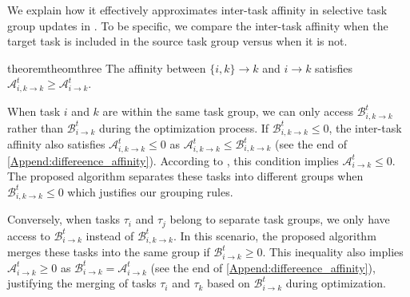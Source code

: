 We explain how it effectively approximates inter-task affinity in selective task group updates in . To be specific, we compare the inter-task affinity when the target task is included in the source task group versus when it is not.
\begin{restatable}[]{theorem}{theomthree}
\label{theorem3}
The affinity between $\{i, k\}\rightarrow k$ and $i \rightarrow k$ satisfies $\mathcal{A}_{i,k \rightarrow k}^t \geq \mathcal{A}_{i \rightarrow k}^t$.
\end{restatable}

When task $i$ and $k$ are within the same task group, we can only access $\mathcal{B}_{i,k \rightarrow k}^t$ rather than $\mathcal{B}_{i \rightarrow k}^t$ during the optimization process. If $\mathcal{B}_{i,k \rightarrow k}^t \leq 0$, the inter-task affinity also satisfies $\mathcal{A}_{i,k \rightarrow k}^t \leq 0$ as $\mathcal{A}_{i,k \rightarrow k}^t \leq \mathcal{B}_{i,k \rightarrow k}^t$ (see the end of \cref{Append:differeence_affinity}). According to , this condition implies $\mathcal{A}_{i\rightarrow k}^t\leq 0$. The proposed algorithm separates these tasks into different groups when $\mathcal{B}_{i,k \rightarrow k}^t \leq 0$ which justifies our grouping rules.

Conversely, when tasks $\tau_i$ and $\tau_j$ belong to separate task groups, we only have access to $\mathcal{B}_{i \rightarrow k}^t$ instead of $\mathcal{B}_{i,k \rightarrow k}^t$. In this scenario, the proposed algorithm merges these tasks into the same group if $\mathcal{B}_{i \rightarrow k}^t \geq 0$. This inequality also implies $\mathcal{A}_{i\rightarrow k}^t\geq 0$ as $\mathcal{B}_{i \rightarrow k}^t = \mathcal{A}_{i \rightarrow k}^t$ (see the end of \cref{Append:differeence_affinity}), justifying the merging of tasks $\tau_i$ and $\tau_k$ based on $\mathcal{B}_{i \rightarrow k}^t$ during optimization. 